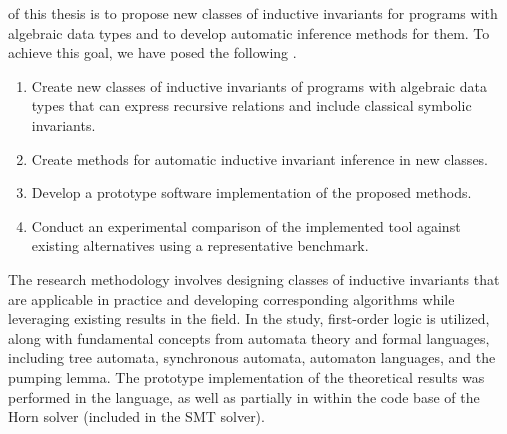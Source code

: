 {\aim} of this thesis is to propose new classes of inductive invariants for programs with algebraic data types and to develop automatic inference methods for them.
To achieve this goal, we have posed the following {\tasks}.
\begin{enumerate}[beginpenalty=10000] %
\item Create new classes of inductive invariants of programs with algebraic data types that can express recursive relations and include classical symbolic invariants.
\item Create methods for automatic inductive invariant inference in new classes.
\item Develop a prototype software implementation of the proposed methods.
\item Conduct an experimental comparison of the implemented tool against existing alternatives using a representative benchmark.
\end{enumerate}

{\methods}
The research methodology involves designing classes of inductive invariants that are applicable in practice and developing corresponding algorithms while leveraging existing results in the field.
In the study, first-order logic is utilized, along with fundamental concepts from automata theory and formal languages, including tree automata, synchronous automata, automaton languages, and the pumping lemma.
The prototype implementation of the theoretical results was performed in the \fsharp{} language, as well as partially in \cplusplus{} within the code base of the \racer{} Horn solver (included in the \zprover{} SMT solver).

